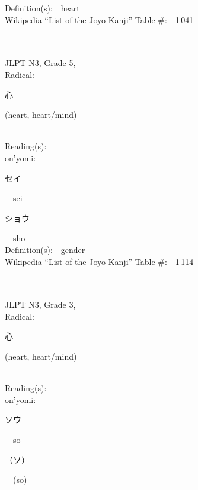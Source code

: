 \begin{multicols}{2}
Definition(s):\ \ heart \\
Wikipedia ``List of the J\=oy\=o Kanji'' Table \#:\ \ 1\,041 \\
\ \ \\
{\fontsize{34pt}{40pt}  }\ \ \\  %
{JLPT N3, Grade 5, \\Radical:\ \ {\begin{CJK}{UTF8}{min} 心 \end{CJK}} (heart, heart/mind) } \\
Reading(s):\ \ \\
{\hspace*{1em}}on'yomi:\ \ \\
{\hspace*{2em}}{\begin{CJK}{UTF8}{min} セイ \end{CJK}}\ \ sei\ \ \\
{\hspace*{2em}}{\begin{CJK}{UTF8}{min} ショウ \end{CJK}}\ \ sh\=o\ \ \\
Definition(s):\ \ gender \\
Wikipedia ``List of the J\=oy\=o Kanji'' Table \#:\ \ 1\,114 \\
\ \ \\
{\fontsize{34pt}{40pt}  }\ \ \\  %
{JLPT N3, Grade 3, \\Radical:\ \ {\begin{CJK}{UTF8}{min} 心 \end{CJK}} (heart, heart/mind) } \\
Reading(s):\ \ \\
{\hspace*{1em}}on'yomi:\ \ \\
{\hspace*{2em}}{\begin{CJK}{UTF8}{min} ソウ \end{CJK}}\ \ s\=o\ \ \\
{\hspace*{2em}}{\begin{CJK}{UTF8}{min} （ソ） \end{CJK}}\ \ (so)\ \ \\

\end{multicols}
